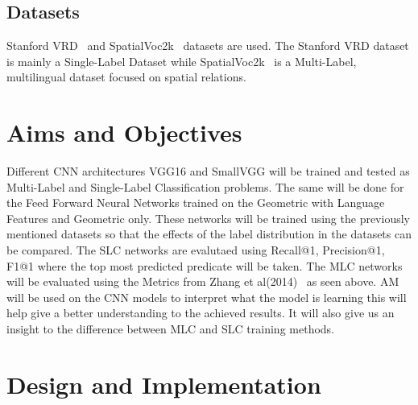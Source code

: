 \documentclass{IEEEtran}
\begin{document}
\subsection{Datasets}
Stanford VRD~\cite{lu2016visual} and SpatialVoc2k~\cite{belz-etal-2018-spatialvoc2k} datasets are used. The Stanford VRD dataset is mainly a Single-Label Dataset while SpatialVoc2k~\cite{belz-etal-2018-spatialvoc2k} is a Multi-Label, multilingual dataset focused on spatial relations.

\section{Aims and Objectives}
Different CNN architectures VGG16 and SmallVGG will be trained and tested as Multi-Label and Single-Label Classification problems. The same will be done for the Feed Forward Neural Networks trained on the Geometric with Language Features and Geometric only. These networks will be trained using the previously mentioned datasets so that the effects of the label distribution in the datasets can be compared. The SLC networks are evalutaed using Recall@1, Precision@1, F1@1 where the top most predicted predicate will be taken. The MLC networks will be evaluated using the Metrics from Zhang et al(2014)~\cite{6471714} as seen above. AM will be used on the CNN models to interpret what the model is learning this will help give a better understanding to the achieved results. It will also give us an insight to the difference between MLC and SLC training methods.

\section{Design and Implementation}
\end{document}

